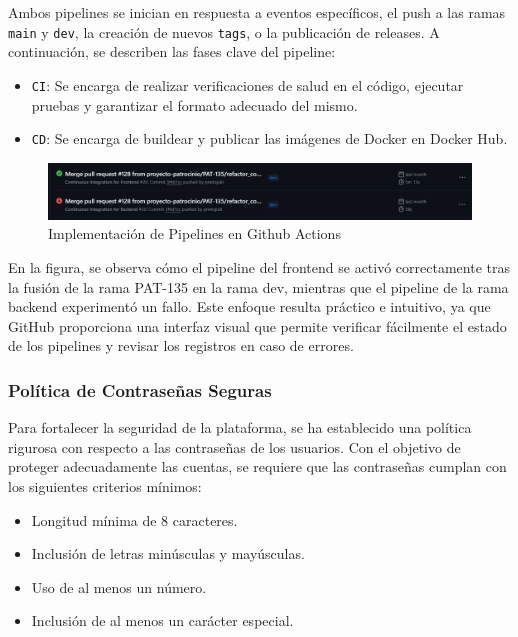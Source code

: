 Ambos pipelines se inician en respuesta a eventos específicos, el push a las ramas \texttt{main} y \texttt{dev}, la creación de nuevos \texttt{tags}, o la publicación de releases. A continuación, se describen las fases clave del pipeline:

\begin{itemize}
    \item \texttt{CI}: Se encarga de realizar verificaciones de salud en el código, ejecutar pruebas y garantizar el formato adecuado del mismo.
    \item \texttt{CD}: Se encarga de buildear y publicar las imágenes de Docker en Docker Hub.
\end{itemize}

\begin{figure}[H]
\centering
\includegraphics[width=1\linewidth]{fig/workflows.png}
\caption{Implementación de Pipelines en Github Actions}
\label{fig:workflows-implementacion}
\end{figure}

En la figura, se observa cómo el pipeline del frontend se activó correctamente tras la fusión de la rama PAT-135 en la rama dev, mientras que el pipeline de la rama backend experimentó un fallo. Este enfoque resulta práctico e intuitivo, ya que GitHub proporciona una interfaz visual que permite verificar fácilmente el estado de los pipelines y revisar los registros en caso de errores.

\subsubsection{Política de Contraseñas Seguras}

Para fortalecer la seguridad de la plataforma, se ha establecido una política rigurosa con respecto a las contraseñas de los usuarios. Con el objetivo de proteger adecuadamente las cuentas, se requiere que las contraseñas cumplan con los siguientes criterios mínimos:

\begin{itemize}
    \item Longitud mínima de 8 caracteres.
    \item Inclusión de letras minúsculas y mayúsculas.
    \item Uso de al menos un número.
    \item Inclusión de al menos un carácter especial.
\end{itemize}

